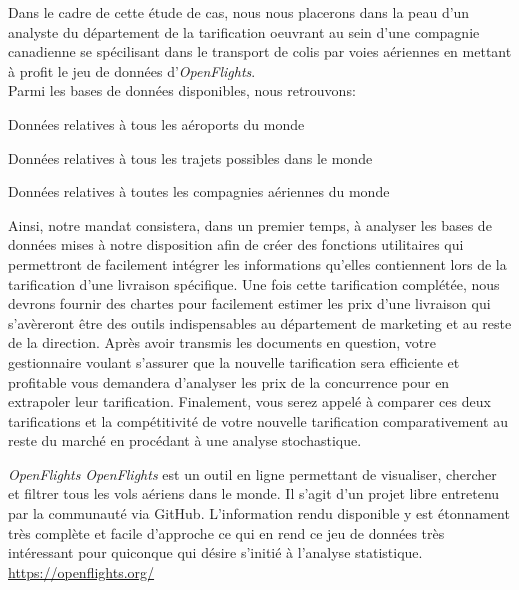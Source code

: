 Dans le cadre de cette étude de cas, nous nous placerons dans la peau d'un analyste du département de la tarification oeuvrant au sein d'une compagnie canadienne se spécilisant dans le transport de colis par voies aériennes en mettant à profit le jeu de données d'\emph{OpenFlights}. \cite{OpenFlightsData} 
 \\
Parmi les bases de données disponibles, nous retrouvons:
\begin{description}[style=multiline,leftmargin=2.5cm]
	\item[airports.dat] Données relatives à tous les aéroports du monde
	\item[routes.dat] Données relatives à tous les trajets possibles dans le monde
	\item[airlines.dat] Données relatives à toutes les compagnies aériennes du monde
\end{description}
\vspace{\baselineskip}
Ainsi, notre mandat consistera, dans un premier temps, à analyser les bases de données mises à notre disposition afin de créer des fonctions utilitaires qui permettront de facilement intégrer les informations qu'elles contiennent lors de la tarification d'une livraison spécifique. Une fois cette tarification complétée, nous devrons fournir des chartes pour facilement estimer les prix d'une livraison qui s'avèreront être des outils indispensables au département de marketing et au reste de la direction. Après avoir transmis les documents en question, votre gestionnaire voulant s'assurer que la nouvelle tarification sera efficiente et profitable vous demandera d'analyser les prix de la concurrence pour en extrapoler leur tarification. Finalement, vous serez appelé à comparer ces deux tarifications et la compétitivité de votre nouvelle tarification comparativement au reste du marché en procédant à une analyse stochastique.

\begin{moreInfo}{\emph{OpenFlights}}
	\emph{OpenFlights} est un outil en ligne permettant de visualiser, chercher et filtrer tous les vols aériens dans le monde. Il s'agit d'un projet libre entretenu par la communauté via GitHub. \cite{GitHub} L'information rendu disponible y est étonnament très complète et facile d'approche ce qui en rend ce jeu de données très intéressant pour quiconque qui désire s'initié à l'analyse statistique.
	\url{https://openflights.org/}
\end{moreInfo}

